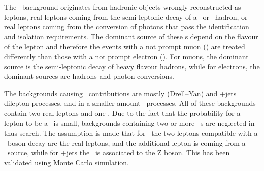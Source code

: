 The \NPL\ background originates from hadronic objects wrongly reconstructed as leptons, real leptons coming from the semi-leptonic decay of a \Pbottom\ or \Pcharm\ hadron, or real leptons coming from the conversion of photons that pass the identification and isolation requirements. The dominant source of these \NPL s depend on the flavour of the lepton and therefore the events with a not prompt muon (\NPM) are treated differently than those with a not prompt electron (\NPE). For muons, the dominant source is the semi-leptonic decay of heavy flavour hadrons, while for electrons, the dominant sources are hadrons and photon conversions. 

The backgrounds causing \NPL\ contributions are mostly \DY (Drell--Yan) and \ttbar+jets dilepton processes, and in a smaller amount \WW\ processes. All of these backgrounds contain two real leptons and one \NPL. Due to the fact that the probability for a lepton to be a \NPL\ is small, backgrounds containing two or more \NPL\ s are neglected in thus search. The assumption is made that for \DY\ the two leptons compatible with a \PZ\ boson decay are the real leptons, and the additional lepton is coming from a \NPL\ source, while for \ttbar+jets the \NPL\ is associated to the Z boson. This has been validated using Monte Carlo simulation.

